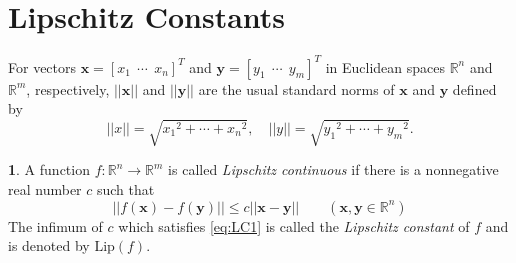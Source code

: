 \documentclass[12pt]{report}
\numberwithin{figure}{chapter}
\theoremstyle{plain}
\theoremstyle{definition}
\newtheorem{definition}[theorem]{\protect\definitionname}
\theoremstyle{corollary}
\theoremstyle{definition}
\theoremstyle{plain}
\theoremstyle{definition}
\theoremstyle{plain}
\providecommand{\definitionname}{Definition}
\newcommand\bx{\ensuremath{\boldsymbol x}}
\newcommand\by{\ensuremath{\boldsymbol y}}
\newcommand\lip{\ensuremath{\text{Lip}}}
\begin{document}
\section{Lipschitz Constants}
For vectors \(\bx=[x_1\:\:\cdots\:\:x_n]^T\) and \(\by=[y_1\:\:\cdots\:\:y_m]^T\) in Euclidean spaces \(\mathbb R^n\) and \(\mathbb R^m\), respectively, \(||\bx||\) and \(||\by||\) are the usual standard norms of \bx{} and \by{} defined by
\begin{equation}\label{eq:euclidean_norm}
||x||=\sqrt{{x_1}^2+\cdots+{x_n}^2},\quad ||y||=\sqrt{{y_1}^2+\cdots+{y_m}^2}.
\end{equation}

\begin{definition}\label{LC}
A function \(f:\mathbb R^n\to\mathbb R^m\) is called \emph{Lipschitz continuous} if there is a nonnegative real number \(c\) such that
\begin{equation}\label{eq:LC1}
||f(\bx)-f(\by)||\le c||\bx-\by||\qquad(\bx,\by\in\mathbb R^n)
\end{equation}
The infimum of \(c\) which satisfies \eqref{eq:LC1} is called the \emph{Lipschitz constant} of \(f\) and is denoted by \(\lip(f)\).
\end{definition}
\end{document}
